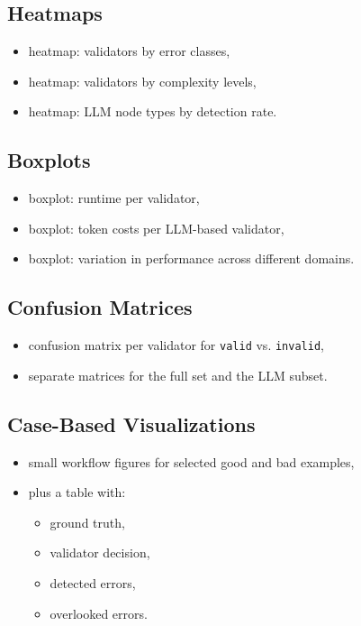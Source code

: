 \documentclass[12pt,a4paper]{article}
\begin{document}
\subsection{Heatmaps}

\begin{itemize}
  \item heatmap: validators by error classes,
  \item heatmap: validators by complexity levels,
  \item heatmap: LLM node types by detection rate.
\end{itemize}

\subsection{Boxplots}

\begin{itemize}
  \item boxplot: runtime per validator,
  \item boxplot: token costs per LLM-based validator,
  \item boxplot: variation in performance across different domains.
\end{itemize}

\subsection{Confusion Matrices}

\begin{itemize}
  \item confusion matrix per validator for \texttt{valid} vs. \texttt{invalid},
  \item separate matrices for the full set and the LLM subset.
\end{itemize}

\subsection{Case-Based Visualizations}

\begin{itemize}
  \item small workflow figures for selected good and bad examples,
  \item plus a table with:
  \begin{itemize}
    \item ground truth,
    \item validator decision,
    \item detected errors,
    \item overlooked errors.
  \end{itemize}
\end{itemize}
\end{document}
